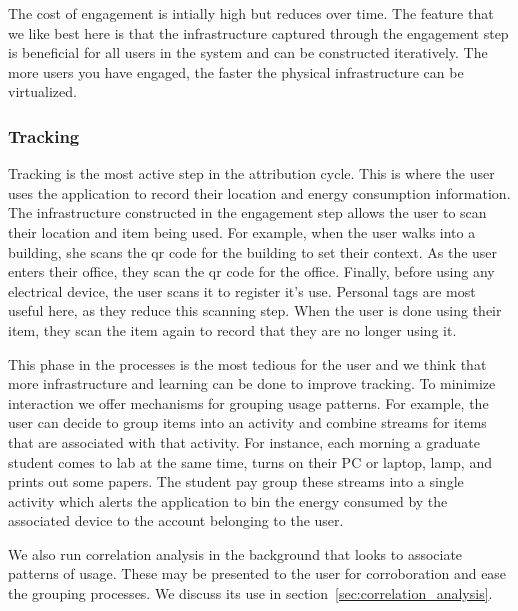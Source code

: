 The cost of engagement is intially high but reduces over time.  The feature that we like best here is that the infrastructure captured through the engagement
step is beneficial for all users in the system and can be constructed iteratively.  The more users you have engaged, the faster the physical infrastructure
can be virtualized.

\subsubsection{Tracking}

Tracking is the most active step in the attribution cycle.  This is where the user uses the application to record their location and energy consumption
information.  The infrastructure constructed in the engagement step allows the user to scan their location and item being used.  For example, when the user walks into a building, she scans the qr code for the building to set their context.  As the user enters their office, they scan the qr code for the office.  Finally, 
before using any electrical device, the user scans it to register it's use.  Personal tags are most useful here, as they reduce this scanning step.
When the user is done using their item, they scan the item again to record that they are no longer using it.

This phase in the processes is the most tedious for the user and we think that more infrastructure and learning can be done to improve tracking.
To minimize interaction we offer mechanisms for grouping usage patterns.  For example, the user can decide to group items into an activity and 
combine streams for items that are associated with that activity.  For instance, each morning a graduate student comes to lab at the same time, 
turns on their PC or laptop, lamp, and prints out some papers.  The student pay group these streams into a single activity which alerts the application
to bin the energy consumed by the associated device to the account belonging to the user.

We also run correlation analysis in the background that looks to associate patterns of usage.  These may be presented to the user for corroboration
and ease the grouping processes.  We discuss its use in section~\ref{sec:correlation_analysis}.


